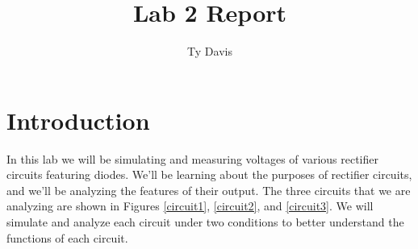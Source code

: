 \documentclass{article}
\author{Ty Davis}
\title{Lab 2 Report}
\begin{document}
\maketitle

\section{Introduction}
In this lab we will be simulating and measuring voltages
of various rectifier circuits featuring diodes. We'll be 
learning about the purposes of rectifier circuits, and 
we'll be analyzing the features of their output. The three
circuits that we are analyzing are shown in Figures \ref{circuit1},
\ref{circuit2}, and \ref{circuit3}. We will simulate and 
analyze each circuit under two conditions to better 
understand the functions of each circuit. 
\end{document}
